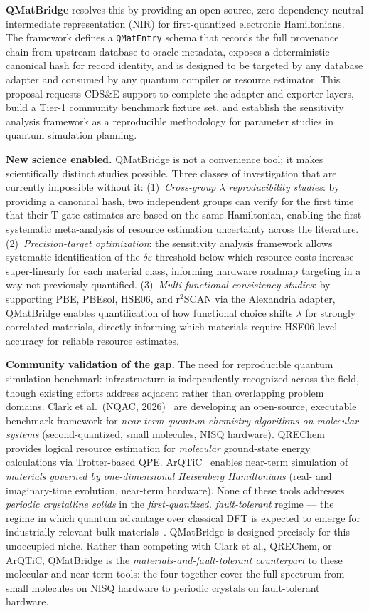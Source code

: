 \documentclass[11pt]{article}
\newcommand{\de}{\delta\varepsilon}
\begin{document}
\textbf{QMatBridge} resolves this by providing an open-source, zero-dependency
neutral intermediate representation (NIR) for first-quantized electronic
Hamiltonians.
The framework defines a \texttt{QMatEntry} schema that records the full
provenance chain from upstream database to oracle metadata, exposes a
deterministic canonical hash for record identity, and is designed to be
targeted by any database adapter and consumed by any quantum compiler or
resource estimator.
This proposal requests CDS\&E support to complete the adapter and exporter
layers, build a Tier-1 community benchmark fixture set, and establish the
sensitivity analysis framework as a reproducible methodology for parameter
studies in quantum simulation planning.

\textbf{New science enabled.}
QMatBridge is not a convenience tool; it makes scientifically distinct
studies possible.
Three classes of investigation that are currently impossible without it:
(1)~\emph{Cross-group $\lambda$ reproducibility studies}: by providing a
canonical hash, two independent groups can verify for the first time that
their T-gate estimates are based on the same Hamiltonian, enabling the first
systematic meta-analysis of resource estimation uncertainty across the
literature.
(2)~\emph{Precision-target optimization}: the sensitivity analysis framework
allows systematic identification of the $\de$ threshold below which
resource costs increase super-linearly for each material class, informing
hardware roadmap targeting in a way not previously quantified.
(3)~\emph{Multi-functional consistency studies}: by supporting PBE,
PBEsol, HSE06, and r$^2$SCAN via the Alexandria adapter, QMatBridge enables
quantification of how functional choice shifts $\lambda$ for strongly
correlated materials, directly informing which materials require HSE06-level
accuracy for reliable resource estimates.

\textbf{Community validation of the gap.}
The need for reproducible quantum simulation benchmark infrastructure is
independently recognized across the field, though existing efforts address
adjacent rather than overlapping problem domains.
Clark et al.\ (NQAC, 2026)~\cite{Clark2026} are developing an open-source,
executable benchmark framework for \emph{near-term quantum chemistry algorithms
on molecular systems} (second-quantized, small molecules, NISQ hardware).
QREChem~\cite{QREChem2023} provides logical resource estimation for
\emph{molecular} ground-state energy calculations via Trotter-based QPE.
ArQTiC~\cite{ArQTiC2022} enables near-term simulation of \emph{materials
governed by one-dimensional Heisenberg Hamiltonians} (real- and imaginary-time
evolution, near-term hardware).
None of these tools addresses \emph{periodic crystalline solids} in the
\emph{first-quantized, fault-tolerant} regime --- the regime in which quantum
advantage over classical DFT is expected to emerge for industrially relevant
bulk materials~\cite{vonBurg2021,Yoshioka2022}.
QMatBridge is designed precisely for this unoccupied niche.
Rather than competing with Clark et al., QREChem, or ArQTiC, QMatBridge is the
\emph{materials-and-fault-tolerant counterpart} to these molecular and near-term
tools: the four together cover the full spectrum from small molecules on NISQ
hardware to periodic crystals on fault-tolerant hardware.
\end{document}
